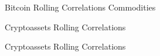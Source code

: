 \documentclass[c, 10pt]{beamer}
\begin{document}
\begin{frame}{Bitcoin Rolling Correlations}
    Commodities
	\begin{figure}
		\centering
		\noindent{}
	\end{figure}
\end{frame}
\begin{frame}{Cryptoassets Rolling Correlations}
	\begin{figure}
		\centering
		\noindent{}
	\end{figure}
\end{frame}
\begin{frame}{Cryptoassets Rolling Correlations}
	\begin{figure}
		\centering
		\noindent{}
	\end{figure}
\end{frame}
\end{document}
